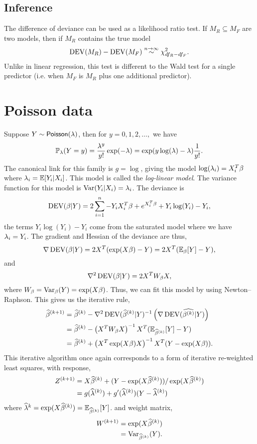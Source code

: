 {\subsection{Inference}
The difference of deviance can be used as a likelihood ratio test. If $M_R \subseteq M_F$ are two models, then if $M_R$ contains the true model 
\[\operatorname{DEV}(M_R)-\operatorname{DEV}(M_F) \stackrel{n \to \infty}{\sim} \chi^2_{df_R-df_F}. \]
Unlike in linear regression, this test is different to the Wald test for a single predictor (i.e. when $M_F$ is $M_R$ plus one additional predictor).
\section{Poisson data}
Suppose $Y \sim \mathsf{Poisson}(\lambda)$, then for $y=0,1,2,\ldots,$ we have
\[{\mathbb{P}}_\lambda(Y=y) = \frac{\lambda^y}{y!}\exp(-\lambda) = \exp(y \log(\lambda)-\lambda)\frac{1}{y!}. \]
The canonical link for this family is $g = \log$, giving the model $\log(\lambda_i) = X_i^T\beta$ where $\lambda_i = {\mathbb{E}}[Y_i|X_i]$. This model is called the \emph{log-linear model}. The variance function for this model is $\operatorname{Var}(Y_i|X_i) = \lambda_i$. The deviance is 
\[\operatorname{DEV}(\beta|Y) = 2\sum_{i=1}^n -Y_iX_i^T\beta+e^{X_i^T\beta}+Y_i\log(Y_i)-Y_i,  \]
the terms $Y_i\log(Y_i)-Y_i$ come from the saturated model where we have $\lambda_i = Y_i$. The gradient and Hessian of the deviance are thus,
\[\nabla \operatorname{DEV}(\beta|Y) = 2X^T(\exp(X\beta)-Y) = 2X^T({\mathbb{E}}_{\beta}[Y]-Y), \]
and
\[\nabla^2 \operatorname{DEV}(\beta|Y) = 2X^TW_{\beta}X, \]
where $W_{\beta} = \operatorname{Var}_\beta(Y) = \exp(X\beta)$. Thus, we can fit this model by using Newton--Raphson. This gives us the iterative rule,
\begin{align*}
    \widehat{\beta}^{(k+1)} &= \widehat{\beta}^{(k)} -  \nabla^2 \operatorname{DEV}(\widehat{\beta}^{(k)}|Y)^{-1}\left(\nabla\operatorname{DEV}(\widehat{{\beta}^{(k)}}|Y)\right)\\
    &=\widehat{\beta}^{(k)} - \left(X^TW_{\beta}X\right)^{-1}X^T({\mathbb{E}}_{\widehat{\beta}^{(k)}}[Y]-Y)\\
    &=\widehat{\beta}^{(k)} + \left(X^T\exp(X\beta)X\right)^{-1}X^T(Y-\exp(X\beta)).
\end{align*}
This iterative algorithm once again corresponds to a form of iterative re-weighted least squares, with response,
\begin{align*}
    Z^{(k+1)} &= X\widehat{\beta}^{(k)} +  (Y-\exp(X\widehat{\beta}^{(k)}))/\exp(X\widehat{\beta}^{(k)})\\
    &=g(\widehat{\lambda}^{(k)}) + g'(\widehat{\lambda}^{(k)})(Y-\widehat{\lambda}^{(k)})
\end{align*}
where $\widehat{\lambda}^{k} = \exp(X\widehat{\beta}^{(k)}) = {\mathbb{E}}_{\widehat{\beta}^{(k)}}[Y]$.
and weight matrix,
\begin{align*}
    W^{(k+1)} &= \exp(X\widehat{\beta}^{(k)})\\
    &=\operatorname{Var}_{\widehat{\beta}^{(k)}}(Y).
\end{align*}
}
